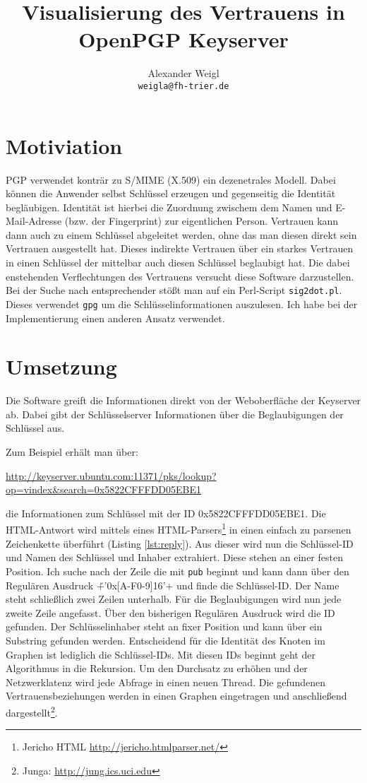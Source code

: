 \documentclass[11pt,a4paper]{scrartcl}
\author{Alexander Weigl\\ \texttt{weigla@fh-trier.de}}
\title{Visualisierung des Vertrauens in OpenPGP Keyserver}
\begin{document}
\maketitle

\section{Motiviation}

PGP verwendet konträr zu S/MIME (X.509) ein dezenetrales Modell.
Dabei können die Anwender selbst Schlüssel erzeugen und 
gegenseitig die Identität begläubigen. Identität ist hierbei die Zuordnung
zwischem dem Namen und E-Mail-Adresse (bzw. der Fingerprint) zur eigentlichen Person.
Vertrauen kann dann auch zu einem Schlüssel abgeleitet werden, ohne das man diesen direkt sein Vertrauen ausgestellt hat. Dieses indirekte Vertrauen über ein starkes Vertrauen in einen Schlüssel der mittelbar auch diesen Schlüssel beglaubigt hat.
Die dabei enstehenden Verflechtungen des Vertrauens versucht diese Software darzustellen. 
Bei der Suche nach entsprechender stößt man auf ein Perl-Script \texttt{sig2dot.pl}. 
Dieses verwendet \texttt{gpg} um die Schlüsselinformationen auszulesen.
Ich habe bei der Implementierung einen anderen Ansatz verwendet.

\section{Umsetzung}
Die Software greift die Informationen direkt von der Weboberfläche der Keyserver ab.
Dabei gibt der Schlüsselserver Informationen über die Beglaubigungen der Schlüssel aus.

Zum Beispiel erhält man über:

\begin{center}
	\url{http://keyserver.ubuntu.com:11371/pks/lookup?op=vindex&search=0x5822CFFFDD05EBE1}
\end{center}

die Informationen zum Schlüssel mit der ID 0x5822CFFFDD05EBE1.
Die HTML-Antwort wird mittels eines HTML-Parsers\footnote{Jericho HTML \url{http://jericho.htmlparser.net/}} in einen einfach zu parsenen Zeichenkette überführt (Listing \ref{lst:reply}).
Aus dieser wird nun die Schlüssel-ID und Namen des Schlüssel und Inhaber extrahiert.
Diese stehen an einer festen Position. Ich suche nach der Zeile die mit \texttt{pub} beginnt und kann dann 
über den Regulären Ausdruck \v+'0x[A-F0-9]{16}'+ und finde die Schlüssel-ID. Der Name steht schließlich zwei Zeilen unterhalb. Für die Beglaubigungen wird nun jede zweite Zeile angefasst. Über den bisherigen Regulären Ausdruck wird die ID gefunden. Der Schlüsselinhaber steht an fixer Position und kann über ein Substring gefunden werden. Entscheidend für die Identität des Knoten im Graphen ist lediglich die Schlüssel-IDs. Mit diesen IDs beginnt geht der Algorithmus in die Rekursion. 
Um den Durchsatz zu erhöhen und der Netzwerklatenz wird jede Abfrage in einen neuen Thread.
Die gefundenen Vertrauensbeziehungen werden in einen Graphen eingetragen und anschließend dargestellt\footnote{Junga: \url{http://jung.ics.uci.edu}}.
\end{document}
